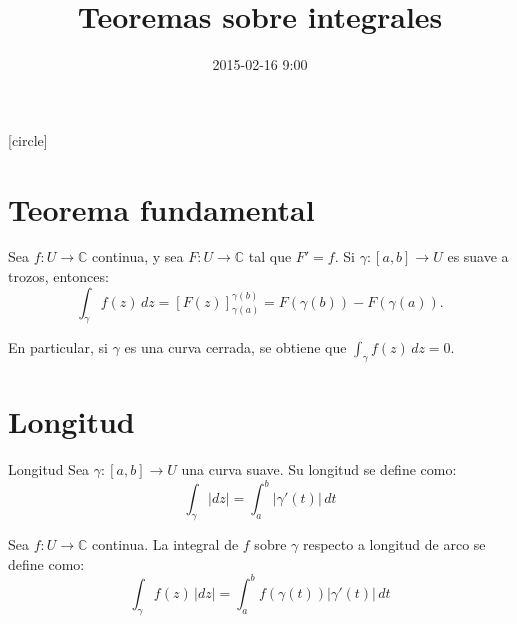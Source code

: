 \documentclass[spanish,presentation]{beamer}
\date{2015-02-16 9:00}
\title{Teoremas sobre integrales}
\begin{document}
\maketitle
{}
[circle]

\tableofcontents

\section{Teorema fundamental}
\label{sec-1}

\begin{frame}[label=sec-1-1]{}
\begin{theorem}
Sea \(f\colon U\to \mathbb{C}\) continua, y sea \(F\colon U\to
    \mathbb{C}\) tal que \(F'=f\). Si \(\gamma\colon[a,b]\to U\) es
suave a trozos, entonces:
\begin{displaymath}
\int_{\gamma}f(z)\,dz=[F(z)]_{\gamma(a)}^{\gamma(b)}=F(\gamma(b))-F(\gamma(a)).
\end{displaymath}
\end{theorem}

\begin{block}{}
En particular, si \(\gamma\) es una curva cerrada, se obtiene que
\(\int_{\gamma}f(z)\,dz=0\). 
\end{block}
\end{frame}

\section{Longitud}
\label{sec-2}

\begin{frame}[label=sec-2-1]{}
\begin{block}{Longitud}
Sea \(\gamma\colon[a,b]\to U\) una curva suave. Su \alert{longitud} se
define como:
\begin{displaymath}
\int_{\gamma}|dz|=\int_{a}^{b}|\gamma'(t)|\,dt
\end{displaymath}
\end{block}

\begin{block}{}
Sea \(f\colon U\to \mathbb{C}\) continua. La \alert{integral de \(f\)
sobre \(\gamma\) respecto a longitud de arco} se define como:
\begin{displaymath}
\int_{\gamma} f(z)\,|dz|=\int_{a}^{b} f(\gamma(t))|\gamma'(t)|\,dt
\end{displaymath}
\end{block}
\end{frame}
\end{document}
